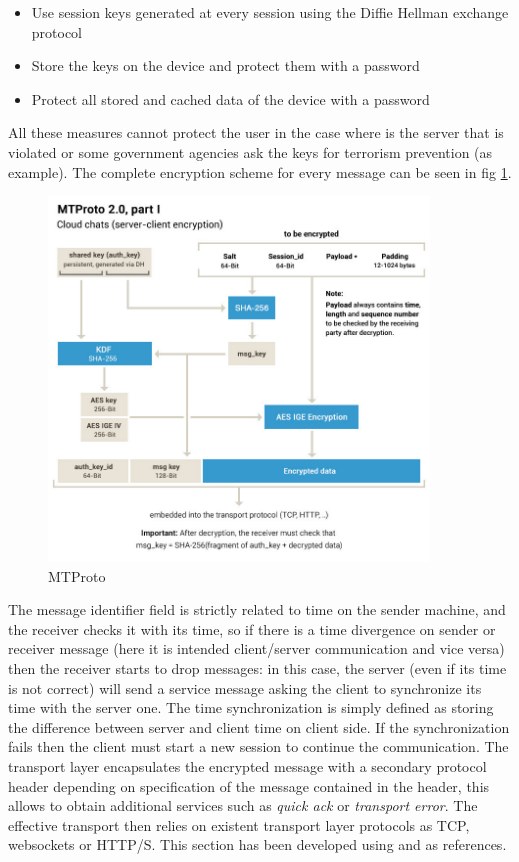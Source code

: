 \documentclass{article}
\begin{document}
\begin{itemize}
	\item Use session keys generated at every session using the Diffie Hellman exchange protocol
	\item Store the keys on the device and protect them with a password
	\item Protect all stored and cached data of the device with a password
\end{itemize}

All these measures cannot protect the user in the case where is the server that is violated or some government agencies ask the keys for terrorism prevention (as example). The complete encryption scheme for every message can be seen in fig \ref{fig:MTProto}.

\begin{figure}[H]
	\centering
	\includegraphics[width=0.9\textwidth]{images/mt_p1.jpg}
	\caption{MTProto}
	\label{fig:MTProto}
\end{figure}

The message identifier field is strictly related to time on the sender machine, and the receiver checks it with its time, so if there is a time divergence on sender or receiver message (here it is intended client/server communication and vice versa) then the receiver starts to drop messages: in this case, the server (even if its time is not correct) will send a service message asking the client to synchronize its time with the server one. The time synchronization is simply defined as storing the difference between server and client time on client side. If the synchronization fails then the client must start a new session to continue the communication.\newline
The transport layer encapsulates the encrypted message with a secondary protocol header depending on specification of the message contained in the header, this allows to obtain additional services such as \textit{quick ack} or \textit{transport error}. The effective transport then relies on existent transport layer protocols as TCP, websockets or HTTP/S.\newline
This section has been developed using \cite{MTProto} and \cite{tel_wiki} as references.
\end{document}
